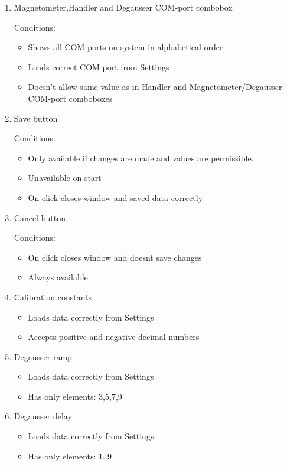 \label{cases:SettingsPanel}

\begin{enumerate}

\item Magnetometer,Handler and Degausser COM-port combobox

Conditions:
\begin{itemize}
\item Shows all COM-ports on system in alphabetical order
\item Loads correct COM port from Settings
\item Doesn't allow same value as in Handler and Magnetometer/Degausser COM-port comboboxes
\end{itemize}

\item Save button

Conditions:
\begin{itemize}
\item Only available if changes are made and values are permissible.
\item Unavailable on start
\item On click closes window and saved data correctly
\end{itemize}

\item Cancel button

Conditions:
\begin{itemize}
\item On click closes window and doesnt save changes
\item Always available
\end{itemize}

\item Calibration constants
\begin{itemize}
\item Loads data correctly from Settings
\item Accepts positive and negative decimal numbers
\end{itemize}

\item Degausser ramp
\begin{itemize}
\item Loads data correctly from Settings
\item Has only elements: 3,5,7,9
\end{itemize}

\item Degausser delay
\begin{itemize}
\item Loads data correctly from Settings
\item Has only elements: 1..9
\end{itemize}


\end{enumerate}
